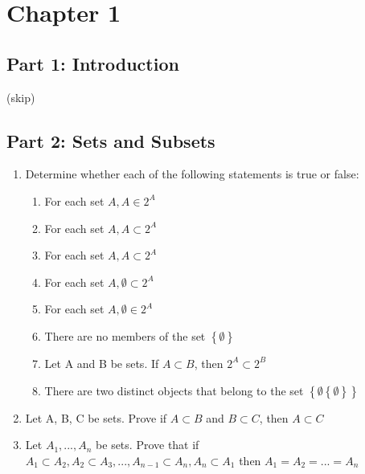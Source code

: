 \documentclass[12pt]{article}
\begin{document}
\section*{Chapter 1}

	\subsection*{Part 1: Introduction}

	(skip)

	\subsection*{Part 2: Sets and Subsets}

	\begin{enumerate}
		\item Determine whether each of the following statements is true or false:
		\begin{enumerate}
			\item For each set $ A, A \in 2^A $
			\item For each set $ A, A \subset 2^A $
			\item For each set $ A, {A} \subset 2^A $
			\item For each set $ A, \emptyset \subset 2^A $
			\item For each set $ A, \emptyset \in 2^A $
			\item There are no members of the set $ \left\{ \emptyset \right\} $
			\item Let A and B be sets. If $\displaystyle A \subset B$, then $ 2^A \subset 2^B $
			\item There are two distinct objects that belong to the set $ \left\{ \emptyset \left\{ \emptyset \right\} \right\} $
		\end{enumerate}
		\item Let A, B, C be sets. Prove if $ A \subset B $ and $ B \subset C $, then $ A \subset C $
		\item Let $ A_1,...,A_n $ be sets. Prove that if $ A_1 \subset A_2, A_2 \subset A_3, ..., A_{n-1} \subset A_n, A_n \subset A_1 $ then $ A_1 = A_2 = ... = A_n $
	\end{enumerate}
\end{document}
